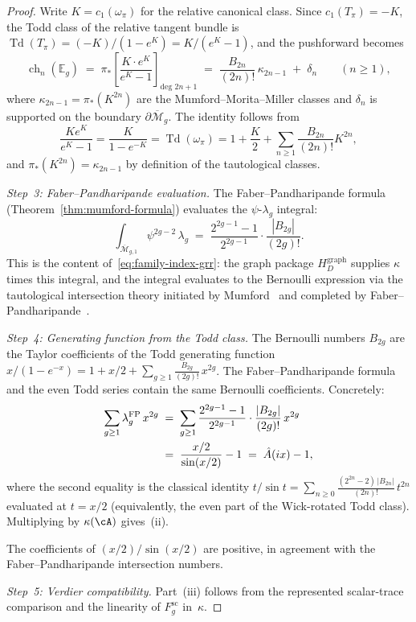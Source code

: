 \begin{proof}
Write $K = c_1(\omega_\pi)$ for the relative canonical class. Since
$c_1(T_\pi) = -K$, the Todd class of the relative tangent bundle is
$\operatorname{Td}(T_\pi) = (-K)/(1 - e^K) = K/(e^K - 1)$, and the
pushforward becomes
\begin{equation}\label{eq:mumford-chern-character}
\operatorname{ch}_n(\mathbb{E}_g)
\;=\;
\pi_*\!\left[
 \frac{K \cdot e^K}{e^K - 1}
\right]_{\text{deg } 2n+1}
\;=\;
\frac{B_{2n}}{(2n)!}\,\kappa_{2n-1}
\;+\; \delta_n
\qquad (n \geq 1),
\end{equation}
where $\kappa_{2n-1} = \pi_*(K^{2n})$ are the
Mumford--Morita--Miller classes \cite{Mumford83}
and $\delta_n$ is supported on the boundary
$\partial\overline{\mathcal{M}}_g$.
The identity follows from
\[
\frac{K e^K}{e^K-1}
= \frac{K}{1 - e^{-K}}
= \operatorname{Td}(\omega_\pi)
= 1 + \frac{K}{2} + \sum_{n \geq 1} \frac{B_{2n}}{(2n)!} K^{2n},
\]
and $\pi_*(K^{2n}) = \kappa_{2n-1}$ by definition of the tautological
classes.

\emph{Step~3: Faber--Pandharipande evaluation.}
The Faber--Pandharipande formula
(Theorem~\ref{thm:mumford-formula}) evaluates the
$\psi$-$\lambda_g$ integral:
\[
\int_{\overline{\mathcal{M}}_{g,1}} \psi^{2g-2}\,\lambda_g
\;=\;
\frac{2^{2g-1}-1}{2^{2g-1}} \cdot
\frac{|B_{2g}|}{(2g)!}.
\]
This is the content of~\eqref{eq:family-index-grr}: the graph package
$H_D^{\mathrm{graph}}$ supplies $\kappa$ times this integral, and the
integral evaluates to the Bernoulli expression
via the tautological intersection theory initiated by
Mumford~\cite{Mumford83} and completed by
Faber--Pandharipande~\cite{FP03}.

\emph{Step~4: Generating function from the Todd class.}
The Bernoulli numbers $B_{2g}$ are the Taylor coefficients of
the Todd generating function
$x/(1 - e^{-x}) = 1 + x/2 + \sum_{g \geq 1}
\frac{B_{2g}}{(2g)!}\, x^{2g}$.
The Faber--Pandharipande formula and the even Todd series contain the
same Bernoulli coefficients.  Concretely:
\begin{align}
\sum_{g \geq 1} \lambda_g^{\mathrm{FP}}\, x^{2g}
&\;=\;
\sum_{g \geq 1}
\frac{2^{2g-1}-1}{2^{2g-1}} \cdot
\frac{|B_{2g}|}{(2g)!}\, x^{2g}
\notag \\
&\;=\;
\frac{x/2}{\sin(x/2)} - 1
\;=\; \hat{A}(ix) - 1,
\label{eq:bernoulli-a-hat}
\end{align}
where the second equality is the classical identity
$t/\sin t = \sum_{n \geq 0}
\frac{(2^{2n}-2)\,|B_{2n}|}{(2n)!}\,t^{2n}$
evaluated at $t = x/2$ (equivalently, the even part of
the Wick-rotated Todd class).
Multiplying by $\kappa(\cA)$ gives~(ii).

The coefficients of $(x/2)/\sin(x/2)$ are positive, in agreement
with the Faber--Pandharipande intersection numbers.

\emph{Step~5: Verdier compatibility.}
Part~(iii) follows from the represented scalar-trace comparison and
the linearity of $F_g^{\mathrm{sc}}$ in~$\kappa$.
\end{proof}

